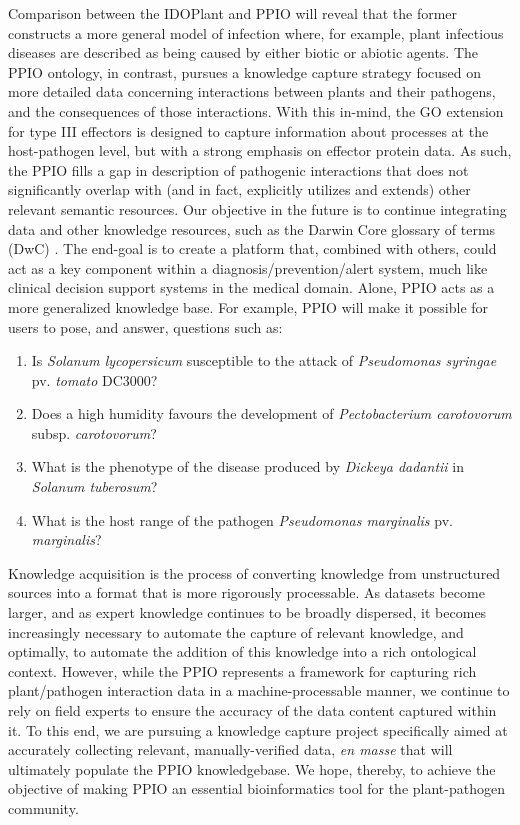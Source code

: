 \documentclass[sw]{iosart2c}
\begin{document}
Comparison between the IDOPlant and PPIO will reveal that the former constructs a more general model of infection where, for example, plant infectious diseases are described as being caused by either biotic or abiotic agents. The PPIO ontology, in contrast, pursues a knowledge capture strategy focused on more detailed data concerning interactions between plants and their pathogens, and the consequences of those interactions. With this in-mind, the GO extension for type III effectors is designed to capture information about processes at the host-pathogen level, but with a strong emphasis on effector protein data. As such, the PPIO fills a gap in description of pathogenic interactions that does not significantly overlap with (and in fact, explicitly utilizes and extends) other relevant semantic resources.  Our objective in the future is to continue integrating data and other knowledge resources, such as the Darwin Core glossary of terms (DwC) \cite{Wieczorek2013}. The end-goal is to create a platform that, combined with others, could act as a key component within a diagnosis/prevention/alert system, much like clinical decision support systems in the medical domain. Alone, PPIO acts as a more generalized knowledge base. For example, PPIO will make it possible for users to pose, and answer, questions such as:

\begin{enumerate}
\item Is {\itshape Solanum lycopersicum} susceptible to the attack of {\itshape Pseudomonas syringae} pv. {\itshape tomato} DC3000?
\item Does a high humidity favours the development of {\itshape Pectobacterium carotovorum} subsp. {\itshape carotovorum}?
\item What is the phenotype of the disease produced by {\itshape Dickeya dadantii} in {\itshape Solanum tuberosum}?
\item What is the host range of the pathogen {\itshape Pseudomonas marginalis} pv. {\itshape marginalis}?

\end{enumerate}

Knowledge acquisition is the process of converting knowledge from unstructured sources into a format that is more rigorously processable. As datasets become larger, and as expert knowledge continues to be broadly dispersed, it becomes increasingly necessary to automate the capture of relevant knowledge, and optimally, to automate the addition of this knowledge into a rich ontological context. However, while the PPIO represents a framework for capturing rich plant/pathogen interaction data in a machine-processable manner, we continue to rely on field experts to ensure the accuracy of the data content captured within it. To this end, we are pursuing a knowledge capture project specifically aimed at accurately collecting relevant, manually-verified data, {\itshape en masse} that will ultimately populate the PPIO knowledgebase. We hope, thereby, to achieve the objective of making PPIO an essential bioinformatics tool for the plant-pathogen community.
\end{document}

